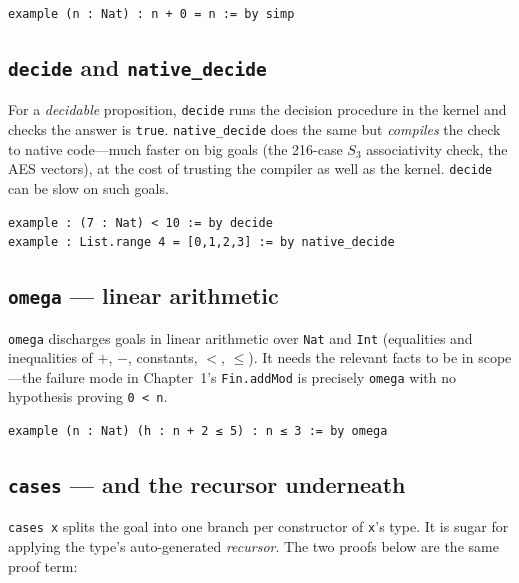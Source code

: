 \documentclass[11pt, a4paper, oneside]{book}
\newcommand{\lc}[1]{\texttt{#1}}
\begin{document}
\begin{leanbox}
\begin{verbatim}
example (n : Nat) : n + 0 = n := by simp
\end{verbatim}
\end{leanbox}

\subsection*{\lc{decide} and \lc{native\_decide}}

For a \emph{decidable} proposition, \lc{decide} runs the decision procedure in
the kernel and checks the answer is \lc{true}. \lc{native\_decide} does the same
but \emph{compiles} the check to native code---much faster on big goals (the
216-case $S_3$ associativity check, the AES vectors), at the cost of trusting the
compiler as well as the kernel. \lc{decide} can be slow on such goals.

\begin{leanbox}
\begin{verbatim}
example : (7 : Nat) < 10 := by decide
example : List.range 4 = [0,1,2,3] := by native_decide
\end{verbatim}
\end{leanbox}

\subsection*{\lc{omega} --- linear arithmetic}

\lc{omega} discharges goals in linear arithmetic over \lc{Nat} and \lc{Int}
(equalities and inequalities of $+$, $-$, constants, $<$, $\le$). It needs the
relevant facts to be in scope---the failure mode in Chapter~1's \lc{Fin.addMod}
is precisely \lc{omega} with no hypothesis proving \lc{0 < n}.

\begin{leanbox}
\begin{verbatim}
example (n : Nat) (h : n + 2 ≤ 5) : n ≤ 3 := by omega
\end{verbatim}
\end{leanbox}

\subsection*{\lc{cases} --- and the recursor underneath}

\lc{cases x} splits the goal into one branch per constructor of \lc{x}'s type.
It is sugar for applying the type's auto-generated \emph{recursor}. The two
proofs below are the same proof term:
\end{document}
